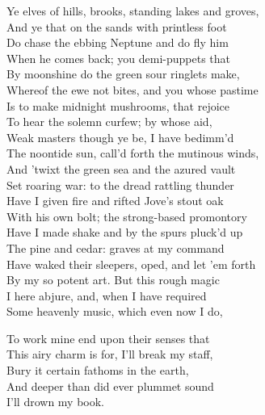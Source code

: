 	
\exit{}




\begin{verse_speech}[Prospero] 
Ye elves of hills, brooks, standing lakes and groves,\\
And ye that on the sands with printless foot\\
Do chase the ebbing Neptune and do fly him\\
When he comes back; you demi-puppets that\\
By moonshine do the green sour ringlets make,\\
Whereof the ewe not bites, and you whose pastime\\
Is to make midnight mushrooms, that rejoice\\
To hear the solemn curfew; by whose aid,\\
Weak masters though ye be, I have bedimm'd\\
The noontide sun, call'd forth the mutinous winds,\\
And 'twixt the green sea and the azured vault\\
Set roaring war: to the dread rattling thunder\\
Have I given fire and rifted Jove's stout oak\\
With his own bolt; the strong-based promontory\\
Have I made shake and by the spurs pluck'd up\\
The pine and cedar: graves at my command\\
Have waked their sleepers, oped, and let 'em forth\\
By my so potent art. But this rough magic\\
I here abjure, and, when I have required\\
Some heavenly music, which even now I do,\\


To work mine end upon their senses that\\
This airy charm is for, I'll break my staff,\\
Bury it certain fathoms in the earth,\\
And deeper than did ever plummet sound\\
I'll drown my book.
\end{verse_speech}


